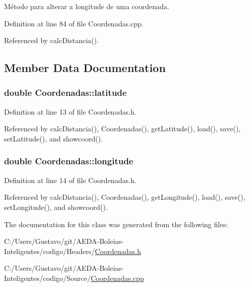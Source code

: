 Método para alterar a longitude de uma coordenada. 



Definition at line 84 of file Coordenadas.\+cpp.



Referenced by calc\+Distancia().



\subsection{Member Data Documentation}
\hypertarget{class_coordenadas_ad7aa0271fc0ca8c8da179f9cfe859bf0}{
\subsubsection[{latitude}]{\setlength{\rightskip}{0pt plus 5cm}double Coordenadas\+::latitude\hspace{0.3cm}{\ttfamily [private]}}}\label{class_coordenadas_ad7aa0271fc0ca8c8da179f9cfe859bf0}


Definition at line 13 of file Coordenadas.\+h.



Referenced by calc\+Distancia(), Coordenadas(), get\+Latitude(), load(), save(), set\+Latitude(), and showcoord().

\hypertarget{class_coordenadas_a328c0d572b3a7d47bfbd866f5d6d6489}{
\subsubsection[{longitude}]{\setlength{\rightskip}{0pt plus 5cm}double Coordenadas\+::longitude\hspace{0.3cm}{\ttfamily [private]}}}\label{class_coordenadas_a328c0d572b3a7d47bfbd866f5d6d6489}


Definition at line 14 of file Coordenadas.\+h.



Referenced by calc\+Distancia(), Coordenadas(), get\+Longitude(), load(), save(), set\+Longitude(), and showcoord().



The documentation for this class was generated from the following files\+:\begin{DoxyCompactItemize}
\item 
C\+:/\+Users/\+Gustavo/git/\+A\+E\+D\+A-\/\+Boleias-\/\+Inteligentes/codigo/\+Headers/\hyperlink{_coordenadas_8h}{Coordenadas.\+h}\item 
C\+:/\+Users/\+Gustavo/git/\+A\+E\+D\+A-\/\+Boleias-\/\+Inteligentes/codigo/\+Source/\hyperlink{_coordenadas_8cpp}{Coordenadas.\+cpp}\end{DoxyCompactItemize}
